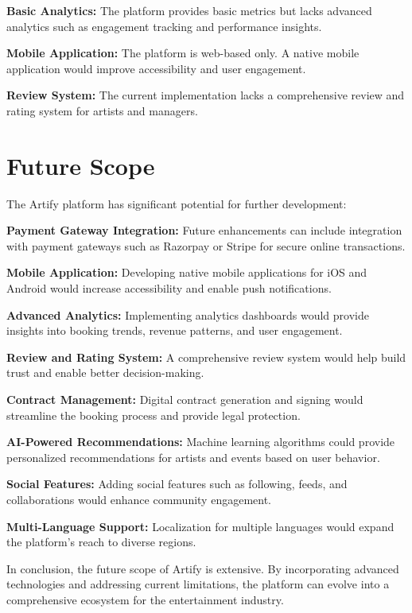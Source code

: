 \documentclass[12pt,a4paper]{report}
\begin{document}
\textbf{Basic Analytics:}  
The platform provides basic metrics but lacks advanced analytics such as engagement tracking and performance insights.

\textbf{Mobile Application:}  
The platform is web-based only. A native mobile application would improve accessibility and user engagement.

\textbf{Review System:}  
The current implementation lacks a comprehensive review and rating system for artists and managers.

\section{Future Scope}

The Artify platform has significant potential for further development:

\textbf{Payment Gateway Integration:}  
Future enhancements can include integration with payment gateways such as Razorpay or Stripe for secure online transactions.

\textbf{Mobile Application:}  
Developing native mobile applications for iOS and Android would increase accessibility and enable push notifications.

\textbf{Advanced Analytics:}  
Implementing analytics dashboards would provide insights into booking trends, revenue patterns, and user engagement.

\textbf{Review and Rating System:}  
A comprehensive review system would help build trust and enable better decision-making.

\textbf{Contract Management:}  
Digital contract generation and signing would streamline the booking process and provide legal protection.

\textbf{AI-Powered Recommendations:}  
Machine learning algorithms could provide personalized recommendations for artists and events based on user behavior.

\textbf{Social Features:}  
Adding social features such as following, feeds, and collaborations would enhance community engagement.

\textbf{Multi-Language Support:}  
Localization for multiple languages would expand the platform's reach to diverse regions.

In conclusion, the future scope of Artify is extensive. By incorporating advanced technologies and addressing current limitations, the platform can evolve into a comprehensive ecosystem for the entertainment industry.

\end{document}
